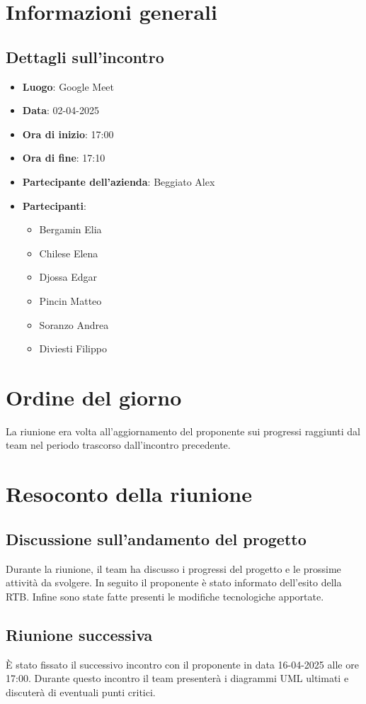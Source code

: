 \section{Informazioni generali}
\subsection{Dettagli sull'incontro}
\begin{itemize}
    \item \textbf{Luogo}: Google Meet
    \item \textbf{Data}: 02-04-2025
    \item \textbf{Ora di inizio}: 17:00
    \item \textbf{Ora di fine}: 17:10
    \item \textbf{Partecipante dell'azienda}: Beggiato Alex
    \item \textbf{Partecipanti}:
    \begin{itemize}
        \item Bergamin Elia
        \item Chilese Elena
        \item Djossa Edgar
        \item Pincin Matteo 
        \item Soranzo Andrea
        \item Diviesti Filippo  
    \end{itemize}
\end{itemize}

\section{Ordine del giorno}
La riunione era volta all'aggiornamento del proponente sui progressi raggiunti dal team nel periodo trascorso dall'incontro precedente.

\section{Resoconto della riunione}
\subsection{Discussione sull'andamento del progetto}
Durante la riunione, il team ha discusso i progressi del progetto e le prossime attività da svolgere. In seguito il proponente è stato informato dell'esito della RTB. Infine sono state fatte presenti le
modifiche tecnologiche apportate.

\subsection{Riunione successiva}
È stato fissato il successivo incontro con il proponente in data 16-04-2025 alle ore 17:00.
Durante questo incontro il team presenterà i diagrammi UML ultimati e discuterà di eventuali punti critici.